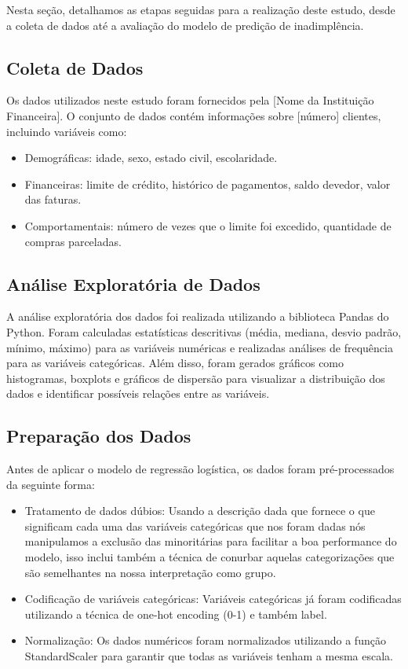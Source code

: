 \documentclass{abntpuc}
\begin{document}
Nesta seção, detalhamos as etapas seguidas para a realização deste estudo, desde a coleta de dados até a avaliação do modelo de predição de inadimplência.

\subsection{Coleta de Dados}
Os dados utilizados neste estudo foram fornecidos pela [Nome da Instituição Financeira]. O conjunto de dados contém informações sobre [número] clientes, incluindo variáveis como:

\begin{itemize}
    \item Demográficas: idade, sexo, estado civil, escolaridade.
    \item Financeiras: limite de crédito, histórico de pagamentos, saldo devedor, valor das faturas.
    \item Comportamentais: número de vezes que o limite foi excedido, quantidade de compras parceladas.
\end{itemize}

\subsection{Análise Exploratória de Dados}
A análise exploratória dos dados foi realizada utilizando a biblioteca Pandas do Python. Foram calculadas estatísticas descritivas (média, mediana, desvio padrão, mínimo, máximo) para as variáveis numéricas e realizadas análises de frequência para as variáveis categóricas.
Além disso, foram gerados gráficos como histogramas, boxplots e gráficos de dispersão para visualizar a distribuição dos dados e identificar possíveis relações entre as variáveis.

\subsection{Preparação dos Dados}
Antes de aplicar o modelo de regressão logística, os dados foram pré-processados da seguinte forma:
\begin{itemize}
    \item Tratamento de dados dúbios: Usando a descrição dada que fornece o que significam cada uma das variáveis categóricas que nos foram dadas nós manipulamos a exclusão das minoritárias para facilitar a boa performance do modelo, isso inclui também a técnica de conurbar aquelas categorizações que são semelhantes na nossa interpretação como grupo.
    \item Codificação de variáveis categóricas: Variáveis categóricas já foram codificadas utilizando a técnica de one-hot encoding (0-1) e também label.
    \item Normalização: Os dados numéricos foram normalizados utilizando a função StandardScaler para garantir que todas as variáveis tenham a mesma escala.
\end{itemize}
\end{document}
